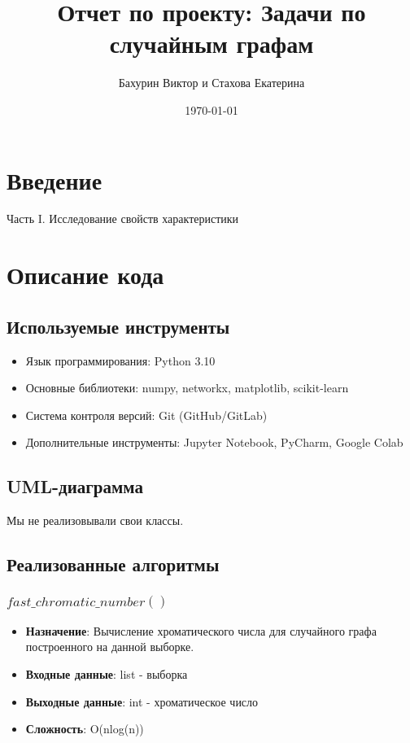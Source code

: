 \documentclass[a4paper, 12pt]{article}
\title{Отчет по проекту: Задачи по случайным графам}
\author{Бахурин Виктор и Стахова Екатерина}
\date{\today}
\begin{document}
\maketitle
\tableofcontents

\section{Введение}
Часть I. Исследование свойств характеристики

\section{Описание кода}
\subsection{Используемые инструменты}
\begin{itemize}
    \item Язык программирования: Python 3.10
    \item Основные библиотеки: numpy, networkx, matplotlib, scikit-learn
    \item Система контроля версий: Git (GitHub/GitLab)
    \item Дополнительные инструменты: Jupyter Notebook, PyCharm, Google Colab
\end{itemize}

\subsection{UML-диаграмма}
Мы не реализовывали свои классы. 

\subsection{Реализованные алгоритмы}
\subsubsection{$fast\_chromatic\_number()$}
\begin{itemize}
    \item \textbf{Назначение}: Вычисление хроматического числа для случайного графа построенного на данной выборке.
    \item \textbf{Входные данные}: list - выборка
    \item \textbf{Выходные данные}: int - хроматическое число
    \item \textbf{Сложность}: O(nlog(n))
\end{itemize}
\end{document}

